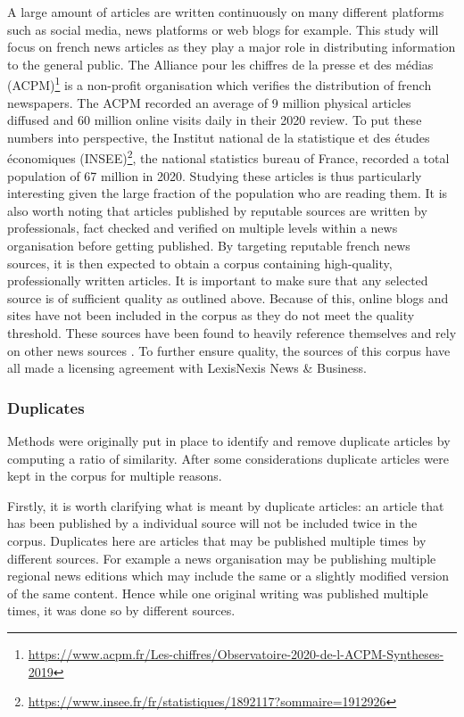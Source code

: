A large amount of articles are written continuously on many different platforms such as social media, news platforms or web blogs for example. This study will focus on french news articles as they play a major role in distributing information to the general public. The Alliance pour les chiffres de la presse et des médias (ACPM)\footnote{\url{https://www.acpm.fr/Les-chiffres/Observatoire-2020-de-l-ACPM-Syntheses-2019}} is a non-profit organisation which verifies the distribution of french newspapers. The ACPM recorded an average of 9 million physical articles diffused and 60 million online visits daily in their 2020 review. To put these numbers into perspective, the Institut national de la statistique et des études économiques (INSEE)\footnote{\url{https://www.insee.fr/fr/statistiques/1892117?sommaire=1912926}}, the national statistics bureau of France, recorded a total population of 67 million in 2020. Studying these articles is thus particularly interesting given the large fraction of the population who are reading them. It is also worth noting that articles published by reputable sources are written by professionals, fact checked and verified on multiple levels within a news organisation before getting published. By targeting reputable french news sources, it is then expected to obtain a corpus containing high-quality, professionally written articles. It is important to make sure that any selected source is of sufficient quality as outlined above. Because of this, online blogs and sites have not been included in the corpus as they do not meet the quality threshold. These sources have been found to heavily reference themselves and rely on other news sources \cite{adamic2005political}. To further ensure quality, the sources of this corpus have all made a licensing agreement with LexisNexis News \& Business.

\subsubsection{Duplicates}

Methods were originally put in place to identify and remove duplicate articles by computing a ratio of similarity. After some considerations duplicate articles were kept in the corpus for multiple reasons.

Firstly, it is worth clarifying what is meant by duplicate articles: an article that has been published by a individual source will not be included twice in the corpus. Duplicates here are articles that may be published multiple times by different sources. For example a news organisation may be publishing multiple regional news editions which may include the same or a slightly modified version of the same content. Hence while one original writing was published multiple times, it was done so by different sources.

